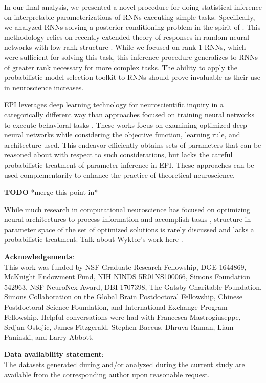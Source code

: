 \documentclass[11pt]{article}
\begin{document}
In our final analysis, we presented a novel procedure for doing statistical inference on interpretable parameterizations of RNNs executing simple tasks. 
Specifically, we analyzed RNNs solving a posterior conditioning problem in the spirit of \cite{pitkow2017inference, echeveste2019cortical}. 
This methodology relies on recently extended theory of responses in random neural networks with low-rank structure \cite{mastrogiuseppe2018linking}. 
While we focused on rank-1 RNNs, which were sufficient for solving this task, this inference procedure generalizes to RNNs of greater rank necessary for more complex tasks.
The ability to apply the probabilistic model selection toolkit to RNNs should prove invaluable as their use in neuroscience increases.

EPI leverages deep learning technology for neuroscientific inquiry in a categorically different way than approaches focused on training neural networks to execute behavioral tasks \cite{richards2019deep}. 
These works focus on examining optimized deep neural networks while considering the objective function, learning rule, and architecture used.
This endeavor efficiently obtains sets of parameters that can be reasoned about with respect to such considerations, but lacks the careful probabilistic treatment of parameter inference in EPI.
These approaches can be used complementarily to enhance the practice of theoretical neuroscience.

\textbf{TODO} *merge this point in*

While much research in computational neuroscience has focused on optimizing neural architectures to process information and accomplish tasks \cite{richards2019deep}, structure in parameter space of the set of optimized solutions is rarely discussed and lacks a probabilistic treatment.  Talk about Wyktor's work here \cite{mlynarski2020statistical}.
 

\textbf{Acknowledgements}: \\
This work was funded by NSF Graduate Research Fellowship,  DGE-1644869, McKnight Endowment Fund, NIH NINDS 5R01NS100066, Simons Foundation 542963, NSF NeuroNex Award, DBI-1707398, The Gatsby Charitable Foundation, Simons Collaboration on the Global Brain Postdoctoral Fellowship, Chinese Postdoctoral Science Foundation, and International Exchange Program Fellowship. 
Helpful conversations were had with Francesca Mastrogiuseppe, Srdjan Ostojic, James Fitzgerald, Stephen Baccus, Dhruva Raman, Liam Paninski, and Larry Abbott.

\textbf{Data availability statement}: \\
The datasets generated during and/or analyzed during the current study are available from the corresponding author upon reasonable request.
\end{document}

